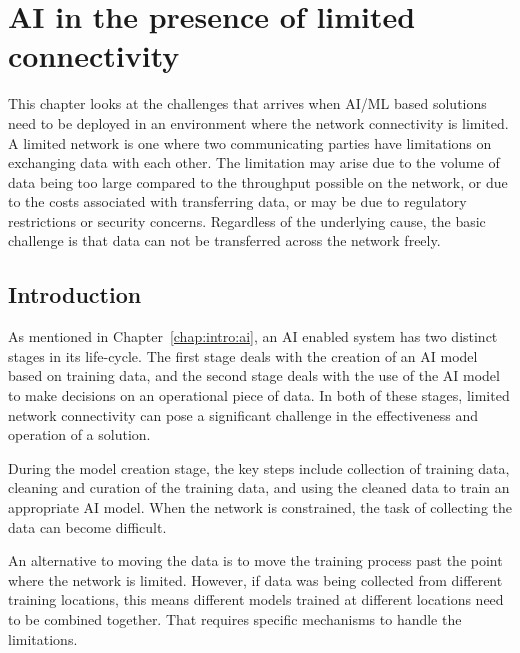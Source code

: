 

\chapter{AI in the presence of limited connectivity}
\label{chap:limited_network}

This chapter looks at the challenges that arrives when AI/ML based solutions need to be deployed in an environment where the network connectivity is limited. A limited network is one where two communicating parties have limitations on exchanging data with each other. The limitation may arise due to the volume of data being too large compared to the throughput possible on the network, or due to the costs associated with transferring data,  or may be due to regulatory restrictions or security concerns. Regardless of the underlying cause, the basic challenge is that data can not be transferred across the network freely. 

\section{Introduction}
\label{sec:limited_network:intro}

As mentioned in Chapter~\ref{chap:intro:ai}, an AI enabled system has two distinct stages in its life-cycle. The first stage deals with the creation of an AI model based on training data, and the second stage deals with the use of the AI model to make decisions on an operational piece of data. In both of these stages, limited network connectivity can pose a significant challenge in the effectiveness and operation of a solution. 

During the model creation stage, the key steps include collection of training data, cleaning and curation of the training data, and using the cleaned data to train an appropriate AI model. When the network is constrained, the task of collecting the data can become difficult. 

An alternative to moving the data is to move the training process past the point where the network is limited. However, if data was being collected from different training locations, this means different models trained at different locations need to be combined together. That requires specific mechanisms to handle the limitations. 

